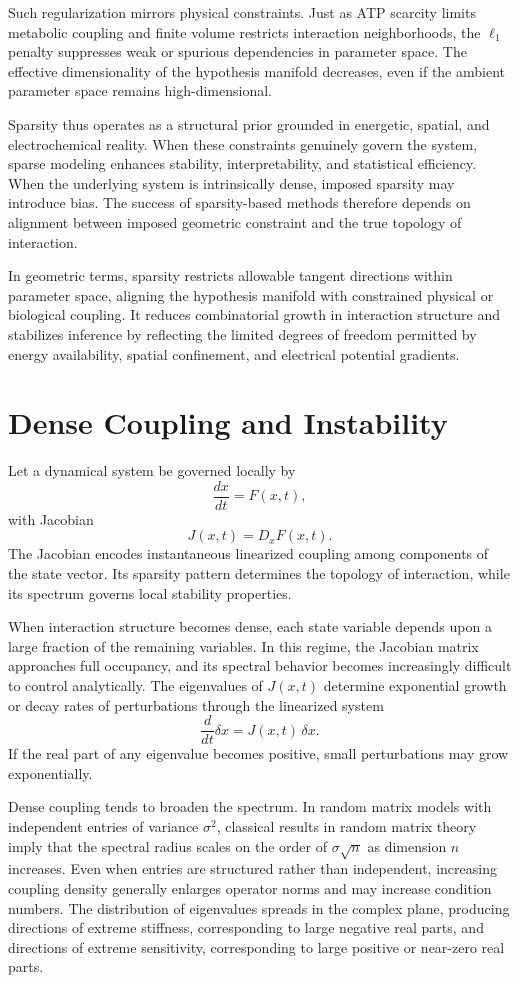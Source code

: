 \documentclass[12pt]{book}
\begin{document}
Such regularization mirrors physical constraints. Just as ATP scarcity limits metabolic coupling and finite volume restricts interaction neighborhoods, the $\ell_1$ penalty suppresses weak or spurious dependencies in parameter space. The effective dimensionality of the hypothesis manifold decreases, even if the ambient parameter space remains high-dimensional.

Sparsity thus operates as a structural prior grounded in energetic, spatial, and electrochemical reality. When these constraints genuinely govern the system, sparse modeling enhances stability, interpretability, and statistical efficiency. When the underlying system is intrinsically dense, imposed sparsity may introduce bias. The success of sparsity-based methods therefore depends on alignment between imposed geometric constraint and the true topology of interaction.

In geometric terms, sparsity restricts allowable tangent directions within parameter space, aligning the hypothesis manifold with constrained physical or biological coupling. It reduces combinatorial growth in interaction structure and stabilizes inference by reflecting the limited degrees of freedom permitted by energy availability, spatial confinement, and electrical potential gradients.

\section{Dense Coupling and Instability}

Let a dynamical system be governed locally by
\[
\frac{dx}{dt} = F(x,t),
\]
with Jacobian
\[
J(x,t) = D_x F(x,t).
\]
The Jacobian encodes instantaneous linearized coupling among components of the state vector. Its sparsity pattern determines the topology of interaction, while its spectrum governs local stability properties.

When interaction structure becomes dense, each state variable depends upon a large fraction of the remaining variables. In this regime, the Jacobian matrix approaches full occupancy, and its spectral behavior becomes increasingly difficult to control analytically. The eigenvalues of $J(x,t)$ determine exponential growth or decay rates of perturbations through the linearized system
\[
\frac{d}{dt}\delta x = J(x,t)\,\delta x.
\]
If the real part of any eigenvalue becomes positive, small perturbations may grow exponentially.

Dense coupling tends to broaden the spectrum. In random matrix models with independent entries of variance $\sigma^2$, classical results in random matrix theory imply that the spectral radius scales on the order of $\sigma \sqrt{n}$ as dimension $n$ increases. Even when entries are structured rather than independent, increasing coupling density generally enlarges operator norms and may increase condition numbers. The distribution of eigenvalues spreads in the complex plane, producing directions of extreme stiffness, corresponding to large negative real parts, and directions of extreme sensitivity, corresponding to large positive or near-zero real parts.
\end{document}
